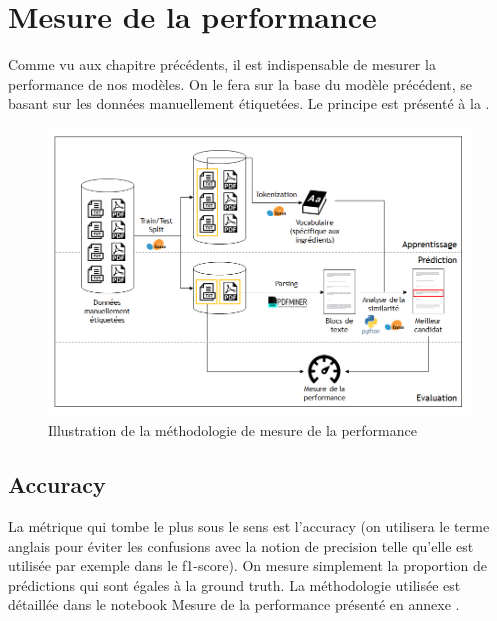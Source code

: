         {\renewcommand{\arraystretch}{1.5}%
        \begin{spacing}{1.0}
        \begin{center}
            {\scriptsize
            
            }
        \end{center}
        \end{spacing}
        }

    \chapter{Mesure de la performance}
    \label{performance}
    
    Comme vu aux chapitre précédents, il est indispensable de mesurer la performance de nos modèles.
    On le fera sur la base du modèle précédent, se basant sur les données manuellement étiquetées.
    Le principe est présenté à la .

    \begin{figure}[htbp]
        \begin{center}
        \includegraphics[width=0.9\linewidth]{img/measured_model.png}
        \end{center}
        \caption{Illustration de la méthodologie de mesure de la performance}
        \label{fig:measured_model}
    \end{figure}     

        \section{Accuracy}
        
        La métrique qui tombe le plus sous le sens est l'accuracy (on utilisera le terme anglais pour éviter les confusions avec la notion de \og precision \fg telle qu'elle est utilisée par exemple dans le f1-score).
        On mesure simplement la proportion de prédictions qui sont égales à la ground truth.
        La méthodologie utilisée est détaillée dans le notebook \og Mesure de la performance \fg présenté en annexe .

